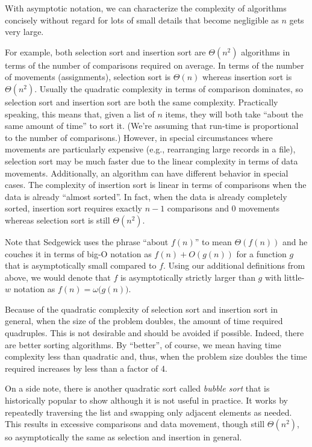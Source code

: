\documentclass{article}
\begin{document}
With asymptotic notation, we can characterize the
complexity of algorithms concisely without regard
for lots of small details that become negligible
as $n$ gets very large.

For example, both selection sort and insertion sort are $\Theta(n^2)$
algorithms in terms of the number of comparisons required on average.
In terms of the number of movements (assignments), selection sort
is $\Theta(n)$ whereas insertion sort is $\Theta(n^2)$.
Usually the quadratic complexity in terms of comparison dominates,
so selection sort and insertion sort are both the same complexity.
Practically speaking, this means that, given a list of $n$ items,
they will both take ``about the same amount of time'' to sort it.
(We're assuming that run-time is proportional to the number of comparisons.)
However, in special circumstances where movements are particularly
expensive (e.g., rearranging large records in a file), selection
sort may be much faster due to the linear complexity in terms of data
movements.
Additionally, an algorithm can have different behavior in special cases.
The complexity of
insertion sort is linear in terms of comparisons when
the data is already ``almost sorted''. In fact, when the data is already
completely sorted, insertion sort requires exactly $n-1$ comparisons
and 0 movements whereas selection sort is still $\Theta(n^2)$.

Note that Sedgewick uses the phrase ``about $f(n)$'' to mean
$\Theta(f(n))$ and he couches it in terms of big-O notation
as $f(n) + O(g(n))$ for a function $g$ that is asymptotically
small compared to $f$. Using our additional definitions from
above, we would denote that $f$ is asymptotically strictly larger
than $g$ with little-$w$ notation as $f(n)=\omega\big(g(n)\big)$.

Because of the quadratic complexity of selection sort and insertion
sort in general, when the size of the problem doubles, the amount of time
required quadruples. This is not desirable and should be avoided if possible.
Indeed, there are better sorting algorithms. By ``better'', of course,
we mean having time complexity less than quadratic
and, thus, when the problem size doubles the time required
increases by less than a factor of 4.

On a side note,
there is another quadratic sort called \textit{bubble sort} that is
historically popular to show
although it is not useful in practice.
It works by repeatedly traversing the list and swapping only adjacent elements
as needed. This results in excessive comparisons and data movement,
though still $\Theta(n^2)$, so asymptotically the same as selection and
insertion in general.
\end{document}
